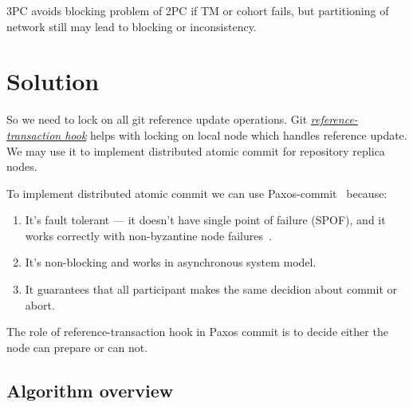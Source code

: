 \documentclass[acmlarge, screen, nonacm]{acmart}
\begin{document}
3PC avoids blocking problem of 2PC if TM or cohort fails,
but partitioning of network still may lead to blocking or inconsistency.


\section{Solution}

So we need to lock on all git reference update operations.
Git \emph{\href{https://git-scm.com/docs/githooks.html\#\_reference\_transaction}{reference-transaction hook}}
helps with locking on local node which handles reference update. We may use it to implement distributed atomic commit
for repository replica nodes.

To implement distributed atomic commit we can use Paxos-commit~\cite{paxos-commit} because:
\begin{enumerate}
  \item It's fault tolerant --- it doesn't have single point of failure (SPOF), and it works correctly with
    non-byzantine node failures~\cite{byzantine-generals}.
  \item It's non-blocking and works in asynchronous system model.
  \item It guarantees that all participant makes the same decidion about commit or abort.
\end{enumerate}

The role of reference-transaction hook in Paxos commit is to decide either the node can prepare or can not.

\subsection{Algorithm overview}
\end{document}
